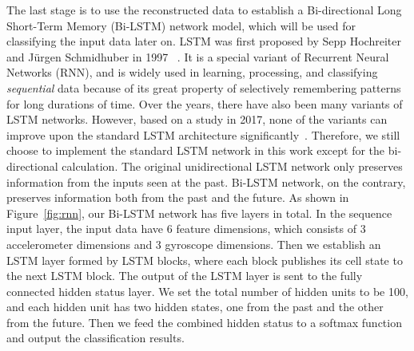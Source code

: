 The last stage is to use the reconstructed data to establish a Bi-directional Long Short-Term Memory (Bi-LSTM) network model, which will be used for classifying the input data later on.
%
 LSTM was first proposed by Sepp Hochreiter and J{\"u}rgen Schmidhuber in 1997 ~\cite{hochreiter1997long}. It is a special variant of  Recurrent Neural Networks (RNN), and is widely used in learning, processing, and classifying \textit{sequential } data because of 
its great property of selectively remembering patterns for long durations of time. 
%
Over the years, there have also been many variants of LSTM networks. However, based on a study in 2017, none of the variants can improve upon the standard LSTM architecture significantly~\cite{greff2017lstm}. Therefore, we still choose to implement the standard LSTM network in this work except for the bi-directional calculation. The original unidirectional LSTM network only preserves information from the inputs seen at the past. Bi-LSTM network, on the contrary, preserves information both from the past and the future. 
%
%
%
As shown in Figure~\ref{fig:rnn}, our Bi-LSTM  network has five layers in total. In the sequence input layer, the input data have 6 feature dimensions, which consists of 3 accelerometer dimensions and 3 gyroscope dimensions. Then we establish an LSTM layer formed by LSTM blocks, where each block publishes its cell state to the next LSTM block. The output of the LSTM layer is sent to the fully connected hidden status layer. We set the total number of hidden units to be 100, and each hidden unit has two hidden states, one from the past and the other from the future. Then we feed the combined hidden status to a softmax function and output the classification results.


%
%
%







